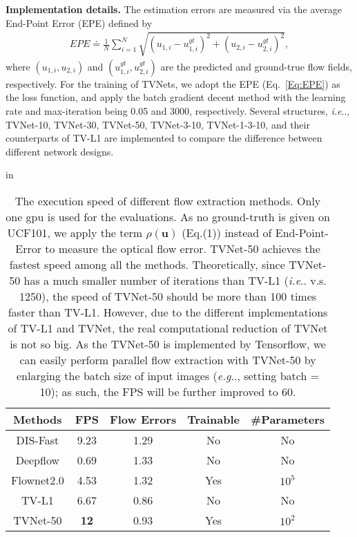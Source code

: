 \documentclass[10pt,twocolumn,letterpaper]{article}
\makeatletter
\DeclareRobustCommand\onedot{\futurelet\@let@token\@onedot}
\def\@onedot{\ifx\@let@token.\else.\null\fi\xspace}
\def\eg{\emph{e.g}\onedot} \def\Eg{\emph{E.g}\onedot}
\def\ie{\emph{i.e}\onedot} \def\Ie{\emph{I.e}\onedot}
\def\Vec#1{{\boldsymbol{#1}}}
\makeatother
\begin{document}
\textbf{Implementation details.}
The estimation errors are measured via the average End-Point Error (EPE) defined by
\begin{eqnarray}
\label{Eq:EPE}
EPE\doteq \frac{1}{N}\sum_{i=1}^N\sqrt{(u_{1,i}-u_{1,i}^{gt})^2+(u_{2,i}-u_{2,i}^{gt})^2},
\end{eqnarray}
where $(u_{1,i},u_{2,i})$ and $(u_{1,i}^{gt},u_{2,i}^{gt})$ are the predicted and ground-true flow fields, respectively.
For the training of TVNets, we adopt the EPE (Eq.~\eqref{Eq:EPE}) as the loss function, and apply the batch gradient decent method with the learning rate and max-iteration being 0.05 and 3000, respectively.
Several structures, \ie, TVNet-10, TVNet-30, TVNet-50, TVNet-3-10, TVNet-1-3-10, and their counterparts of TV-L1 are implemented to compare the difference between different network designs.

\begin{table}[t!]
 in
\centering
\caption{The execution speed of different flow extraction methods. Only one gpu is used for the evaluations. As no ground-truth is given on UCF101, we apply the term $\rho(\Vec{u})$ (Eq.(1)) instead of End-Point-Error to measure the optical flow error. TVNet-50 achieves the fastest speed among all the methods. Theoretically, since TVNet-50 has a much smaller number of iterations than TV-L1 (\ie 50 v.s. 1250), the speed of TVNet-50 should be more than 100 times faster than TV-L1. However, due to the different implementations of TV-L1 and TVNet, the real computational reduction of TVNet is not so big.
As the TVNet-50 is implemented by Tensorflow, we can easily perform parallel flow extraction with TVNet-50 by enlarging the batch size of input images (\eg, setting batch = 10); as such, the FPS will be further improved to 60.}
\label{Tab:time}
\tabcolsep 4pt \renewcommand{\arraystretch}{0.8}
\begin{tabular}{c|c|c|c|c}
\toprule
Methods         & FPS  & Flow Errors & Trainable & \#Parameters\\
\hline
DIS-Fast        & 9.23  & 1.29 & No & No     \\
Deepflow        & 0.69  & 1.33 & No & No     \\
Flownet2.0      & 4.53  & 1.32 & Yes & $10^5$     \\
TV-L1           & 6.67  & 0.86 & No & No     \\
\hline
TVNet-50       & \textbf{12} & 0.93 & Yes &$10^2$ \\
\bottomrule
\end{tabular}
\vskip -0.05in
\end{table}
\end{document}
